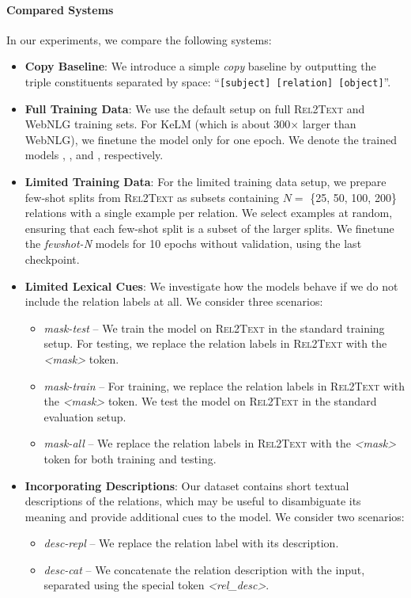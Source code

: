 \paragraph{Compared Systems} In our experiments, we compare the following systems:
\begin{itemize}
    \item \textbf{Copy Baseline}: We introduce a simple \textit{copy} baseline by outputting the triple constituents separated by space: ``\texttt{[subject] [relation] [object]}''.

    \item \textbf{Full Training Data}: We use the default setup on full \textsc{Rel2Text} and WebNLG training sets. For KeLM (which is about 300$\times$ larger than WebNLG), we finetune the model only for one epoch. We denote the trained models \BARTr{}, \BARTw{}, and \BARTk{}, respectively.

    \item \textbf{Limited Training Data}: For the limited training data setup, we prepare few-shot splits from \textsc{Rel2Text} as subsets containing $N=$ \{25, 50, 100, 200\} relations with a single example per relation. We select examples at random, ensuring that each few-shot split is a subset of the larger splits. We finetune the \textit{fewshot-N} models for 10 epochs without validation, using the last checkpoint.

    \item \textbf{Limited Lexical Cues}: We investigate how the models behave if we do not include the relation labels at all. We consider three scenarios:
          \begin{itemize}
              \item \textit{mask-test} -- We train the model on \textsc{Rel2Text} in the standard training setup. For testing, we replace the relation labels in  \textsc{Rel2Text} with the \textit{<mask>} token.
              \item \textit{mask-train} -- For training, we replace the relation labels in  \textsc{Rel2Text} with the \textit{<mask>} token. We test the model on \textsc{Rel2Text} in the standard evaluation setup.
              \item \textit{mask-all} -- We replace the relation labels in  \textsc{Rel2Text} with the \textit{<mask>} token for both training and testing.
          \end{itemize}


    \item \textbf{Incorporating Descriptions}: Our dataset contains short textual descriptions of the relations, which may be useful to disambiguate its meaning and provide additional cues to the model. We consider two scenarios:
          \begin{itemize}
              \item \textit{desc-repl} -- We replace the relation label with its description.
              \item \textit{desc-cat} -- We concatenate the relation description with the input, separated using the special token \textit{<rel\_desc>}.
          \end{itemize}
\end{itemize}

